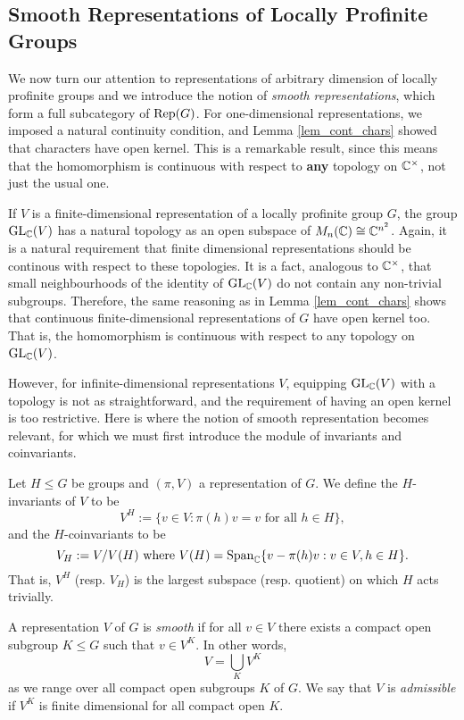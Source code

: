 \subsection{Smooth Representations of Locally Profinite Groups} \label{sec:smoothrep}

We now turn our attention to representations of arbitrary dimension of locally profinite groups and we introduce the notion of \textit{smooth representations}, which form a full subcategory of $\mathrm{Rep}(G)$. For one-dimensional representations, we imposed a natural continuity condition, and Lemma \ref{lem_cont_chars} showed that characters have open kernel. This is a remarkable result, since this means that the homomorphism is continuous with respect to \textbf{any} topology on $\mathbb{C}^{\times}$, not just the usual one. 

If $V$ is a finite-dimensional representation of a locally profinite group $G$, the group $\mathrm{GL}_{\mathbb{C}}(V)$ has a natural topology as an open subspace of $M_n(\mathbb{C})\cong\mathbb{C}^{n^2}$. Again, it is a natural requirement that finite dimensional representations should be continous with respect to these topologies. It is a fact, analogous to $\mathbb{C}^{\times}$, that small neighbourhoods of the identity of $\mathrm{GL}_{\mathbb{C}}(V)$ do not contain any non-trivial subgroups. Therefore, the same reasoning as in Lemma \ref{lem_cont_chars} shows that continuous finite-dimensional representations of $G$ have open kernel too. That is, the homomorphism is continuous with respect to any topology on $\mathrm{GL}_{\mathbb{C}}(V)$.

However, for infinite-dimensional representations $V$, equipping $\mathrm{GL}_{\mathbb{C}}(V)$ with a topology is not as straightforward, and the requirement of having an open kernel is too restrictive. Here is where the notion of smooth representation becomes relevant, for which we must first introduce the module of invariants and coinvariants.

\begin{defn}
    Let $H\leq G$ be groups and $(\pi,V)$ a representation of $G$. We define the $H$-invariants of $V$ to be 
    $$V^{H}:=\{v\in V:\pi(h)v=v\text{ for all }h\in H\},$$
    and the $H$-coinvariants to be 
    $$V_H:=V/V(H)\text{ where } V(H)=\textrm{Span}_{\mathbb{C}}\{v-\pi(h)v:v\in V,h\in H\}.$$
    That is, $V^H$ (resp. $V_H$) is the largest subspace (resp. quotient) on which $H$ acts trivially.
\end{defn}


\begin{defn}
	A representation $V$ of $G$ is \textit{smooth} if for all $v\in V$ there exists a compact open subgroup $K\leq G$ such that $v\in V^K$. In other words,
    $$V=\bigcup_K V^K$$ as we range over all compact open subgroups $K$ of $G$. We say that $V$ is \textit{admissible} if $V^K$ is finite dimensional for all compact open $K$.
\end{defn}

